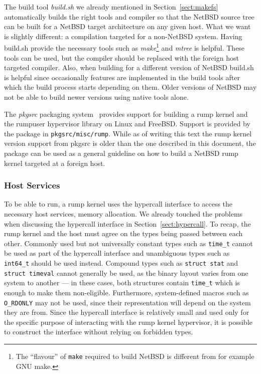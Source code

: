 The build tool \textit{build.sh} we already mentioned in
Section~\ref{sect:makefs} automatically
builds the right tools and compiler so that the NetBSD source tree
can be built for a NetBSD target architecture on any given host.
What we want is slightly different: a compilation targeted for a
non-NetBSD system.  Having build.sh provide the necessary
tools such as \textit{make}\footnote
{
	The ``flavour'' of \texttt{make} required to build NetBSD
	is different from for example GNU make.
}
and \textit{mtree} is helpful.  These tools can be used, but the
compiler should be replaced with the foreign host targeted compiler.
Also, when building for a different version of NetBSD build.sh is
helpful since occasionally features are implemented in the build
tools after which the build process starts depending on them.
Older versions of NetBSD may not be able to build newer versions
using native tools alone.

The \textit{pkgsrc} packaging system~\cite{pkgsrc} provides support
for building a rump kernel and the rumpuser hypervisor library on
Linux and FreeBSD.  Support is provided by the package in
\texttt{pkgsrc/misc/rump}.  While as of writing this text the rump kernel
version support from pkgsrc is older than the one described in this
document, the package can be used as a general guideline on how to
build a NetBSD rump kernel targeted at a foreign host.

\subsubsection*{Host Services}

To be able to run, a rump kernel uses the hypercall interface to
access the necessary host services, \eg memory allocation.
We already touched the problems when discussing the hypercall
interface in Section~\ref{sect:hypercall}.  To recap, the rump
kernel and the host must agree on the types being passed between
each other.  Commonly used but not universally constant types such
as \verb+time_t+ cannot be used as part of the hypercall interface
and unambiguous types such as \verb+int64_t+ should be used instead.
Compound types such as \verb+struct stat+ and \verb+struct timeval+
cannot generally be used, as the binary layout varies from one system
to another --- in these cases, both structures contain \verb+time_t+
which is enough to make them non-eligible.  Furthermore, system-defined
macros such as \verb+O_RDONLY+ may not be used, since their
representation will depend on the system they are from.  Since the
hypercall interface is relatively small and used only for the
specific purpose of interacting with the rump kernel hypervisor,
it is possible to construct the interface without relying on forbidden types.

